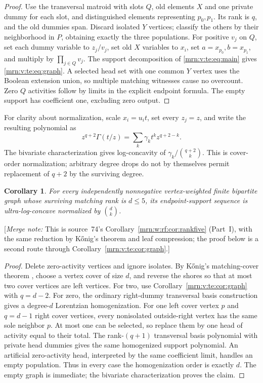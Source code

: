 \documentclass[11pt,a4paper]{article}
\newtheorem{corollary}[theorem]{Corollary}
\theoremstyle{remark}\newtheorem{remark}[theorem]{Remark}
\newcommand{\mnote}[1]{[\textit{Merge note:} #1]}
\begin{document}
\begin{proof}
Use the transversal matroid with slots $Q$, old elements $X$ and one private dummy for each slot, and distinguished elements representing $p_0,p_1$. Its rank is $q$, and the old dummies span. Discard isolated $Y$ vertices; classify the others by their neighborhood in $P$, obtaining exactly the three populations. For positive $v_j$ on $Q$, set each dummy variable to $z_j/v_j$, set old $X$ variables to $x_i$, set $a=x_{p_0},b=x_{p_1}$, and multiply by $\prod_{j\in Q}v_j$. The support decomposition of \eqref{mrn:v:te:eq:main} gives \eqref{mrn:v:te:eq:graph}. A selected head set with one common $Y$ vertex uses the Boolean extension union, so multiple matching witnesses cause no overcount. Zero $Q$ activities follow by limits in the explicit endpoint formula. The empty support has coefficient one, excluding zero output.
\end{proof}

For clarity about normalization, scale $x_i=u_it$, set every $z_j=z$, and write the resulting polynomial as
\[
 z^{q+2}\Gamma(t/z)=\sum_k\gamma_k t^kz^{q+2-k}.
\]
The bivariate characterization \cite[Example 2.26]{b:BH} gives log-concavity of $\gamma_k/\binom{q+2}{k}$. This is cover-order normalization; arbitrary degree drops do not by themselves permit replacement of $q+2$ by the surviving degree.

\begin{corollary}\label{mrn:v:te:cor:rankfive}
For every independently nonnegative vertex-weighted finite bipartite graph whose surviving matching rank is $d\le5$, its endpoint-support sequence is ultra-log-concave normalized by $\binom d k$.
\end{corollary}
\mnote{This is source~74's Corollary~\ref{mrn:w:rf:cor:rankfive} (Part~I), with
the same reduction by K\H{o}nig's theorem and leaf compression; the proof below
is a second route through Corollary~\ref{mrn:v:te:cor:graph}.}

\begin{proof}
Delete zero-activity vertices and ignore isolates. By K\H{o}nig's matching-cover theorem \cite{b:Konig}, choose a vertex cover of size $d$, and reverse the shores so that at most two cover vertices are left vertices. For two, use Corollary~\ref{mrn:v:te:cor:graph} with $q=d-2$. For zero, the ordinary right-dummy transversal basis construction gives a degree-$d$ Lorentzian homogenization. For one left cover vertex $p$ and $q=d-1$ right cover vertices, every nonisolated outside-right vertex has the same sole neighbor $p$. At most one can be selected, so replace them by one head of activity equal to their total. The rank-$(q+1)$ transversal basis polynomial with private head dummies gives the same homogenized support polynomial. An artificial zero-activity head, interpreted by the same coefficient limit, handles an empty population. Thus in every case the homogenization order is exactly $d$. The empty graph is immediate; the bivariate characterization proves the claim.
\end{proof}
\end{document}
